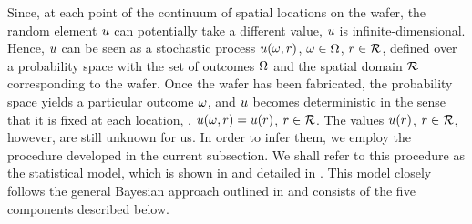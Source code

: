 
Since, at each point of the continuum of spatial locations on the wafer, the random element $u$ can potentially take a different value, $u$ is infinite-dimensional.
Hence, $u$ can be seen as a stochastic process $u(\omega, r)$, $\omega \in \Omega$, $r \in \mathcal{R}$, defined over a probability space with the set of outcomes $\Omega$ and the spatial domain $\mathcal{R}$ corresponding to the wafer.
Once the wafer has been fabricated, the probability space yields a particular outcome $\omega$, and $u$ becomes deterministic in the sense that it is fixed at each location, \ie, $u(\omega, r) = u(r)$, $r \in \mathcal{R}$.
The values $u(r)$, $r \in \mathcal{R}$, however, are still unknown for us.
In order to infer them, we employ the procedure developed in the current subsection. We shall refer to this procedure as the statistical model, which is shown in  and detailed in . This model closely follows the general Bayesian approach outlined in  and consists of the five components described below.

